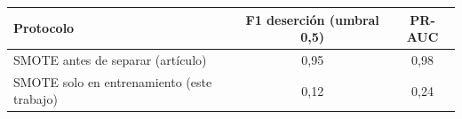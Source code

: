 \begin{tabular}{lcc}
\toprule
Protocolo & F1 deserción (umbral 0,5) & PR-AUC \\
\midrule
SMOTE antes de separar (artículo) & 0{,}95 & 0{,}98 \\
SMOTE solo en entrenamiento (este trabajo) & 0{,}12 & 0{,}24 \\
\bottomrule
\end{tabular}
